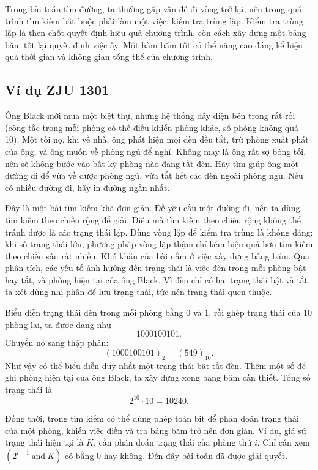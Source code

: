 \documentclass[11pt]{article}
\begin{document}
Trong bài toán tìm đường, ta thường gặp vấn đề đi vòng trở lại, nên trong quá
trình tìm kiếm bắt buộc phải làm một việc: kiểm tra trùng lặp. Kiểm tra trùng
lặp là then chốt quyết định hiệu quả chương trình, còn cách xây dựng một bảng
băm tốt lại quyết định việc ấy. Một hàm băm tốt có thể nâng cao đáng kể hiệu
quả thời gian và không gian tổng thể của chương trình.

\subsection{Ví dụ ZJU 1301}

Ông Black mới mua một biệt thự, nhưng hệ thống dây điện bên trong rất rối
(công tắc trong mỗi phòng có thể điều khiển phòng khác, số phòng không quá
10). Một tối nọ, khi về nhà, ông phát hiện mọi đèn đều tắt, trừ phòng xuất
phát của ông, và ông muốn về phòng ngủ để nghỉ. Không may là ông rất sợ bóng
tối, nên sẽ không bước vào bất kỳ phòng nào đang tắt đèn. Hãy tìm giúp ông
một đường đi để vừa về được phòng ngủ, vừa tắt hết các đèn ngoài phòng ngủ.
Nếu có nhiều đường đi, hãy in đường ngắn nhất.

Đây là một bài tìm kiếm khá đơn giản. Đề yêu cầu một đường đi, nên ta dùng tìm
kiếm theo chiều rộng để giải. Điều mà tìm kiếm theo chiều rộng không thể tránh
được là các trạng thái lặp. Dùng vòng lặp để kiểm tra trùng là không đáng; khi
số trạng thái lớn, phương pháp vòng lặp thậm chí kém hiệu quả hơn tìm kiếm
theo chiều sâu rất nhiều. Khó khăn của bài nằm ở việc xây dựng bảng băm. Qua
phân tích, các yếu tố ảnh hưởng đến trạng thái là việc đèn trong mỗi phòng
bật hay tắt, và phòng hiện tại của ông Black. Vì đèn chỉ có hai trạng thái bật
và tắt, ta xét dùng nhị phân để lưu trạng thái, tức nén trạng thái quen thuộc.

Biểu diễn trạng thái đèn trong mỗi phòng bằng \(0\) và \(1\), rồi ghép trạng
thái của 10 phòng lại, ta được dạng như
\[
  1000100101.
\]
Chuyển nó sang thập phân:
\[
  (1000100101)_2=(549)_{10}.
\]
Như vậy có thể biểu diễn duy nhất một trạng thái bật tắt đèn. Thêm một số để
ghi phòng hiện tại của ông Black, ta xây dựng xong bảng băm cần thiết. Tổng
số trạng thái là
\[
  2^{10}\cdot 10 = 10240.
\]

Đồng thời, trong tìm kiếm có thể dùng phép toán bit để phán đoán trạng thái
của một phòng, khiến việc điền và tra bảng băm trở nên đơn giản. Ví dụ, giả
sử trạng thái hiện tại là \(K\), cần phán đoán trạng thái của phòng thứ \(i\).
Chỉ cần xem \((2^{i-1}\ \mathrm{and}\ K)\) có bằng \(0\) hay không. Đến đây
bài toán đã được giải quyết.
\end{document}
